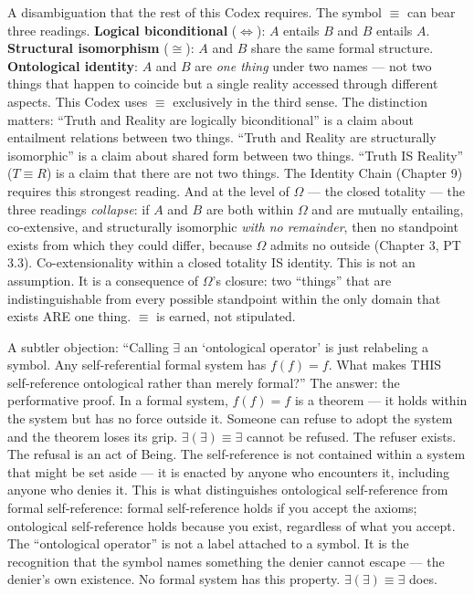 \documentclass[10pt, openany, oneside]{book}
\begin{document}
A disambiguation that the rest of this Codex requires. The symbol $\equiv$ can bear three readings. \textbf{Logical biconditional} ($\iff$): $A$ entails $B$ and $B$ entails $A$. \textbf{Structural isomorphism} ($\cong$): $A$ and $B$ share the same formal structure. \textbf{Ontological identity}: $A$ and $B$ are \textit{one thing} under two names --- not two things that happen to coincide but a single reality accessed through different aspects. This Codex uses $\equiv$ exclusively in the third sense. The distinction matters: ``Truth and Reality are logically biconditional'' is a claim about entailment relations between two things. ``Truth and Reality are structurally isomorphic'' is a claim about shared form between two things. ``Truth IS Reality'' ($T \equiv R$) is a claim that there are not two things. The Identity Chain (Chapter 9) requires this strongest reading. And at the level of $\Omega$ --- the closed totality --- the three readings \textit{collapse}: if $A$ and $B$ are both within $\Omega$ and are mutually entailing, co-extensive, and structurally isomorphic \textit{with no remainder}, then no standpoint exists from which they could differ, because $\Omega$ admits no outside (Chapter 3, PT 3.3). Co-extensionality within a closed totality IS identity. This is not an assumption. It is a consequence of $\Omega$'s closure: two ``things'' that are indistinguishable from every possible standpoint within the only domain that exists ARE one thing. $\equiv$ is earned, not stipulated.

A subtler objection: ``Calling $\exists$ an `ontological operator' is just relabeling a symbol. Any self-referential formal system has $f(f) = f$. What makes THIS self-reference ontological rather than merely formal?'' The answer: the performative proof. In a formal system, $f(f) = f$ is a theorem --- it holds within the system but has no force outside it. Someone can refuse to adopt the system and the theorem loses its grip. $\exists(\exists) \equiv \exists$ cannot be refused. The refuser exists. The refusal is an act of Being. The self-reference is not contained within a system that might be set aside --- it is enacted by anyone who encounters it, including anyone who denies it. This is what distinguishes ontological self-reference from formal self-reference: formal self-reference holds if you accept the axioms; ontological self-reference holds because you exist, regardless of what you accept. The ``ontological operator'' is not a label attached to a symbol. It is the recognition that the symbol names something the denier cannot escape --- the denier's own existence. No formal system has this property. $\exists(\exists) \equiv \exists$ does.
\end{document}
